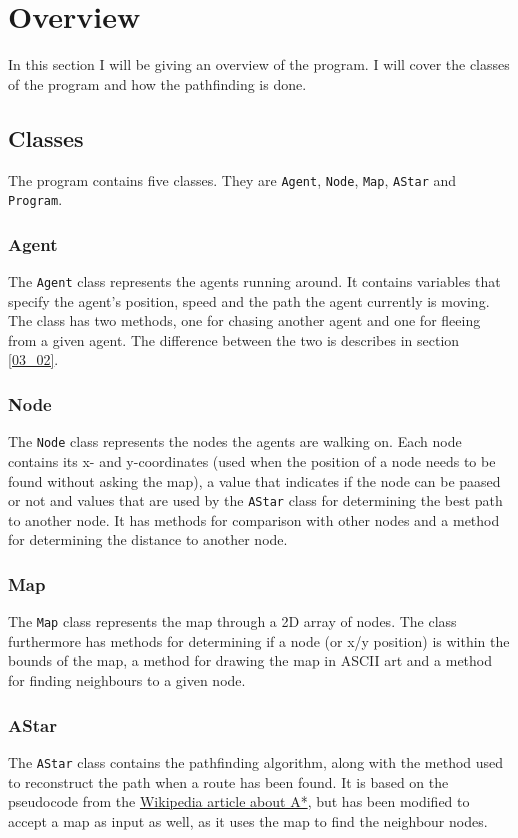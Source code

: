 \section{Overview}
\label{03}

In this section I will be giving an overview of the program. I will cover the classes of the program and how the pathfinding is done.

\subsection{Classes}
\label{03_01}

The program contains five classes. They are \texttt{Agent}, \texttt{Node}, \texttt{Map}, \texttt{AStar} and \texttt{Program}.

\subsubsection{Agent}
\label{03_01_01}
The \texttt{Agent} class represents the agents running around. It contains variables that specify the agent's position, speed and the path the agent currently is moving. The class has two methods, one for chasing another agent and one for fleeing from a given agent. The difference between the two is describes in section \ref{03_02}.

\subsubsection{Node}
\label{03_01_02}
The \texttt{Node} class represents the nodes the agents are walking on. Each node contains its x- and y-coordinates (used when the position of a node needs to be found without asking the map), a value that indicates if the node can be paased or not and values that are used by the \texttt{AStar} class for determining the best path to another node. It has methods for comparison with other nodes and a method for determining the distance to another node.

\subsubsection{Map}
\label{03_01_03}
The \texttt{Map} class represents the map through a 2D array of nodes. The class furthermore has methods for determining if a node (or x/y position) is within the bounds of the map, a method for drawing the map in ASCII art and a method for finding neighbours to a given node.

\subsubsection{AStar}
\label{03_01_04}
The \texttt{AStar} class contains the pathfinding algorithm, along with the method used to reconstruct the path when a route has been found. It is based on the pseudocode from the \href{http://en.wikipedia.org/wiki/A*_search_algorithm#Pseudocode}{Wikipedia article about A*}, but has been modified to accept a map as input as well, as it uses the map to find the neighbour nodes.

